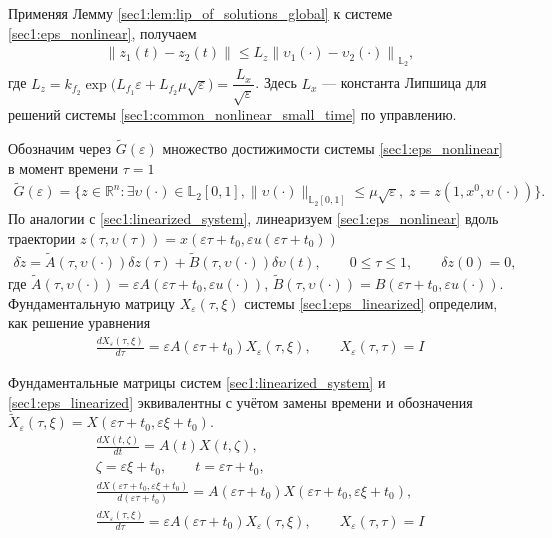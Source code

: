 \documentclass[../main.tex]{subfiles}
\begin{document}
Применяя Лемму \ref{sec1:lem:lip_of_solutions_global}   к системе \eqref{sec1:eps_nonlinear}, получаем
\begin{gather*}
    \left\| z_1(t) - z_2(t) \right\| \leqslant L_z \left\|\upsilon_1(\cdot) - \upsilon_2(\cdot) \right\|_{\mathbb{L}_2},
\end{gather*}
где $ L_z = k_{f_2} \exp\Big( L_{f_1} \varepsilon + L_{f_2} \mu \sqrt{\varepsilon} \Big) = \dfrac{L_x}{\sqrt{\varepsilon}}$.
Здесь $L_x$ --- константа Липшица для решений системы \eqref{sec1:common_nonlinear_small_time} по управлению.
    
Обозначим через $\widetilde{G}(\varepsilon)$ множество достижимости системы \eqref{sec1:eps_nonlinear} в момент времени $\tau=1$
\begin{gather*}
    \widetilde{G}(\varepsilon)=\{z\in \mathbb{R}^n:\exists \upsilon(\cdot)\in \mathbb{L}_2[0,1],  \lVert \upsilon(\cdot)\rVert_{\mathbb{L}_2[0,1]}
    \leqslant  \mu \sqrt{\varepsilon}, \; z=z(1,x^0,\upsilon(\cdot))\}.
\end{gather*}
По аналогии с \eqref{sec1:linearized_system}, линеаризуем \eqref{sec1:eps_nonlinear} вдоль траектории $ z(\tau,\upsilon(\tau)) = x(\varepsilon \tau + t_0,\varepsilon u(\varepsilon \tau + t_0)) $
\begin{gather}\label{sec1:eps_linearized}
    \delta\dot{z} = \widetilde{A}(\tau, \upsilon(\cdot)) \delta z(\tau) +\widetilde{B}(\tau, \upsilon(\cdot)) \delta \upsilon(t),\qquad 0 \leqslant \tau \leqslant 1,  \qquad \delta z(0) = 0,
\end{gather}
где $ \widetilde{A}(\tau, \upsilon(\cdot)) = \varepsilon A(\varepsilon \tau + t_0, \varepsilon u (\cdot)) $,  $\widetilde{B}(\tau, \upsilon(\cdot)) = B(\varepsilon \tau + t_0, \varepsilon u (\cdot)) $. 
Фундаментальную матрицу $ X_{\varepsilon}(\tau,\xi) $ системы \eqref{sec1:eps_linearized} определим, как решение уравнения
\begin{gather*}
    \frac{dX_{\varepsilon}(\tau,\xi)}{d\tau} = \varepsilon A(\varepsilon \tau + t_0) X_{\varepsilon}(\tau,\xi), \qquad X_{\varepsilon}(\tau,\tau) = I
\end{gather*}

Фундаментальные матрицы систем \eqref{sec1:linearized_system} и \eqref{sec1:eps_linearized} эквивалентны с учётом замены времени и обозначения $ \widetilde{X}_{\varepsilon}(\tau,\xi) = X(\varepsilon \tau + t_0,\varepsilon \xi + t_0) $.
\begin{gather*}
    \frac{dX(t,\zeta)}{dt} = A(t) X(t,\zeta), \\
    \zeta = \varepsilon \xi + t_0, \qquad t = \varepsilon \tau + t_0, \\
    \frac{dX(\varepsilon \tau + t_0,\varepsilon \xi + t_0)}{d(\varepsilon \tau + t_0)} = A(\varepsilon \tau + t_0) X(\varepsilon \tau + t_0,\varepsilon \xi + t_0), \\
    \frac{dX_{ \varepsilon}(\tau,\xi)}{d\tau} = \varepsilon A(\varepsilon \tau + t_0) X_{ \varepsilon}(\tau,\xi), \qquad X_{\varepsilon}(\tau,\tau) = I
\end{gather*}
\end{document}
